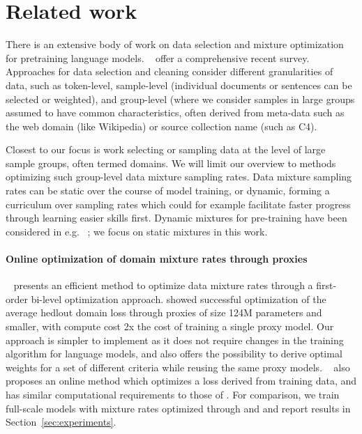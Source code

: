 \section{Related work}
\label{sec:related}
There is an extensive body of work on data selection and mixture optimization for pretraining language models. ~\citet{albalak2024surveydataselectionlanguage} offer a comprehensive recent survey. Approaches for data selection and cleaning consider different granularities of data, such as token-level, sample-level (individual documents or sentences can be selected or weighted), and group-level (where we consider samples in large groups assumed to have common characteristics, often derived from meta-data such as the web domain (like Wikipedia) or source collection name (such as C4).

Closest to our focus is work selecting or sampling data at the level of large sample groups, often termed domains. We will limit our overview to methods optimizing such group-level data mixture sampling rates. Data mixture sampling rates can be static over the course of model training, or dynamic, forming a curriculum over sampling rates which could for example facilitate faster progress through learning easier skills first. Dynamic mixtures for pre-training have been considered in e.g. ~\cite{albalak2023efficientonlinedatamixing,anelia_mix}; we focus on static mixtures in this work.





\paragraph{Online optimization of domain mixture rates through proxies}
{\doge}~\cite{DOGE} presents an efficient method to optimize data mixture rates through a first-order bi-level optimization approach.  {\doge} showed successful optimization of the average hedlout domain loss through proxies of size 124M parameters and smaller, with compute cost 2x the cost of training a single proxy model. Our approach is simpler to implement as it does not require changes in the training algorithm for language models, and also offers the possibility to derive optimal weights for a set of different criteria while reusing the same proxy models. {\doremi}~\cite{doremi} also proposes an online method which optimizes a loss derived from training data, and has similar computational requirements to those of {\doge}.  For comparison, we train full-scale models with mixture rates optimized through {\doge} and {\doremi} and report results in Section~\ref{sec:experiments}.


